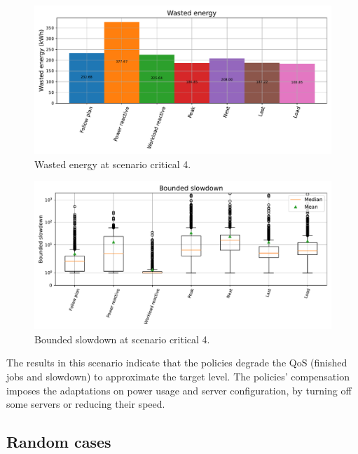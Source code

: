 \begin{figure}[!htb]
    \centering
    \includegraphics[scale=0.55]{Images/Compensations/energy_critical_4.pdf}
    \caption{Wasted energy at scenario critical 4.}
    \label{fig:energy_critical_4}
\end{figure}

\begin{figure}[!htb]
    \centering
    \includegraphics[scale=0.55]{Images/Compensations/slowdown_critical_4.pdf}
    \caption{Bounded slowdown at scenario critical 4.}
    \label{fig:slowdown_critical_4}
\end{figure}

The results in this scenario indicate that the policies degrade the QoS (finished jobs and slowdown) to approximate the target level. The policies' compensation imposes the adaptations on power usage and server configuration, by turning off some servers or reducing their speed. 

\clearpage

\subsection{Random cases}

